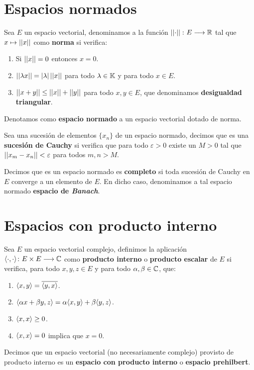 \section{Espacios normados}

\begin{definition} Sea $E$ un espacio vectorial, denominamos a la función $\left|\left|\cdot\right|\right|\colon E\longrightarrow \mathbb{R}$ tal que $x\mapsto\left|\left|x\right|\right|$ como \textbf{norma} si verifica:
\begin{enumerate}[label=\alph*)]
\item Si $\left|\left|x\right|\right|=0$ entonces $x=0$.
\item $\left|\left|\lambda x\right|\right|=|\lambda|\left|\left|x\right|\right|$ para todo $\lambda\in\mathbb{K}$ y para todo $x\in E$.
\item $\left|\left|x+y\right|\right|\leq \left|\left|x\right|\right| + \left|\left|y\right|\right|$ para todo $x,y\in E$, que denominamos \textbf{desigualdad triangular}.
\end{enumerate}

Denotamos como \textbf{espacio normado} a un espacio vectorial dotado de norma.
\end{definition}

\begin{definition} Sea una sucesión de elementos $\{x_n\}$ de un espacio normado, decimos que es una \textbf{sucesión de Cauchy} si verifica que para todo $\varepsilon>0$ existe un $M>0$ tal que $\left|\left|x_m-x_n\right|\right|<\varepsilon$ para todos $m,n>M$.
\end{definition}

\begin{definition} Decimos que es un espacio normado es \textbf{completo} si toda sucesión de Cauchy en $E$ converge a un elemento de $E$. En dicho caso, denominamos a tal espacio normado \textbf{espacio de \textit{Banach}}.
\end{definition}

\section{Espacios con producto interno}

\begin{definition} Sea $E$ un espacio vectorial complejo, definimos la aplicación \\$\langle\cdot,\cdot\rangle\colon E\times E\longrightarrow \mathbb{C}$ como \textbf{producto interno} o \textbf{producto escalar} de $E$ si verifica, para todo $x,y,z\in E$ y para todo $\alpha,\beta\in\mathbb{C}$, que:
\begin{enumerate}[label=\alph*)]
\item $\langle x,y\rangle=\overline{\langle y,x\rangle}$.
\item $\langle\alpha x + \beta y,z\rangle= \alpha \langle x,y\rangle + \beta \langle y,z\rangle$.
\item $\langle x,x\rangle\geq 0$.
\item $\langle x,x\rangle= 0$ implica que $x=0$.
\end{enumerate}

Decimos que un espacio vectorial (no necesariamente complejo) provisto de producto interno es un \textbf{espacio con producto interno} o \textbf{espacio prehilbert}.
\end{definition}

